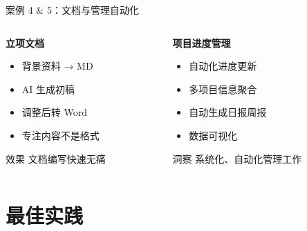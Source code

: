 \documentclass[aspectratio=169,xcolor=dvipsnames]{beamer}
\begin{document}
\begin{frame}{案例 4 \& 5：文档与管理自动化}
  \begin{columns}
    \begin{column}{0.48\textwidth}
      \textbf{立项文档}
      \begin{itemize}
        \item 背景资料 → MD
        \item AI 生成初稿
        \item 调整后转 Word
        \item 专注内容不是格式
      \end{itemize}

      \vspace{0.3cm}

      \begin{exampleblock}{效果}
        文档编写快速无痛
      \end{exampleblock}
    \end{column}
    \begin{column}{0.48\textwidth}
      \textbf{项目进度管理}
      \begin{itemize}
        \item 自动化进度更新
        \item 多项目信息聚合
        \item 自动生成日报周报
        \item 数据可视化
      \end{itemize}

      \vspace{0.3cm}

      \begin{alertblock}{洞察}
        系统化、自动化管理工作
      \end{alertblock}
    \end{column}
  \end{columns}
\end{frame}

\section{最佳实践}
\end{document}
